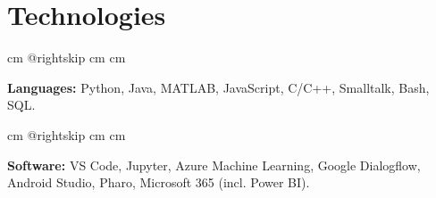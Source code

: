 \documentclass[10pt, letterpaper]{article}
\begin{document}
    
    \section{Technologies}

        \begingroup{} cm
        \advance\csname @rightskip cm
        \advance{} cm

        \textbf{Languages:} Python, Java, MATLAB, JavaScript, C/C++, Smalltalk, Bash, SQL. \par\endgroup

        \vspace{0.2 cm}
        \begingroup{} cm
        \advance\csname @rightskip cm
        \advance{} cm

        \textbf{Software:} VS Code, Jupyter, Azure Machine Learning, Google Dialogflow, Android Studio, Pharo, Microsoft 365 (incl. Power BI). \par\endgroup


    
\end{document}
